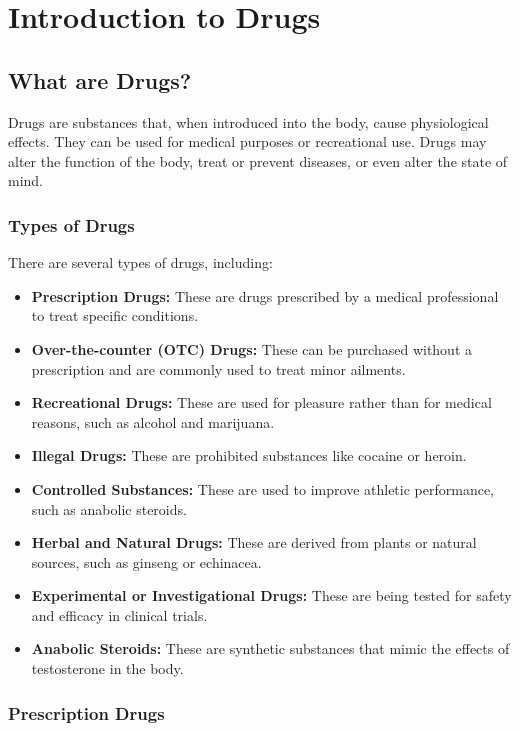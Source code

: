 \chapter{Introduction to Drugs}

\section{What are Drugs?}
Drugs are substances that, when introduced into the body, cause physiological effects. They can be used for medical purposes or recreational use. Drugs may alter the function of the body, treat or prevent diseases, or even alter the state of mind. 

\subsection{Types of Drugs}
There are several types of drugs, including:
\begin{itemize}
    \item \textbf{Prescription Drugs:} These are drugs prescribed by a medical professional to treat specific conditions.
    \item \textbf{Over-the-counter (OTC) Drugs:} These can be purchased without a prescription and are commonly used to treat minor ailments.
    \item \textbf{Recreational Drugs:} These are used for pleasure rather than for medical reasons, such as alcohol and marijuana.
    \item \textbf{Illegal Drugs:} These are prohibited substances like cocaine or heroin.
    \item \textbf{Controlled Substances:} These are used to improve athletic performance, such as anabolic steroids.
    \item \textbf{Herbal and Natural Drugs:} These are derived from plants or natural sources, such as ginseng or echinacea.
    \item \textbf{Experimental or Investigational Drugs:} These are being tested for safety and efficacy in clinical trials.
    \item \textbf{Anabolic Steroids:} These are synthetic substances that mimic the effects of testosterone in the body.
\end{itemize}

\subsection{Prescription Drugs}



